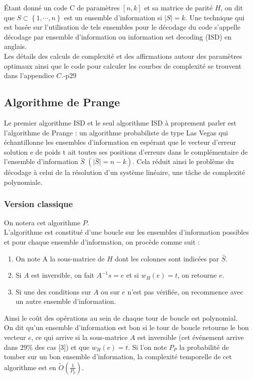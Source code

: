 \documentclass[12pt,openany]{report}
\begin{document}
Étant donné un code C de paramètres $\left[ n, k\right] $ et sa matrice de parité $\mathit{H}$, on dit
que $S \subset \left\lbrace 1,\cdots, n\right\rbrace $ est un ensemble d’information si $\mid S \mid = k$. Une technique qui
est basée sur l’utilisation de tels ensembles pour le décodage du code s’appelle décodage par ensemble d’information ou information set decoding (ISD) en anglais.\\
Les détails des calculs de complexité et des affirmations autour des paramètres optimaux ainsi que le code pour calculer les courbes de complexité se trouvent dans l’appendice $\mathit{C}$.\cite{Ghazal}-p29
\subsection{ Algorithme de Prange}

Le premier algorithme ISD et le seul algorithme ISD à proprement parler est l’algorithme de Prange : un algorithme probabiliste de type Las Vegas qui échantillonne les ensembles d’information en espérant que le vecteur d’erreur solution e de poids t ait toutes ses positions d’erreurs dans le complémentaire de l’ensemble d’information $\overset{-}{S} $ $(\mid \overset{-}{S} \mid = n-k)$. Cela réduit ainsi le problème du décodage à celui de la résolution d’un système linéaire, une tâche de complexité polynomiale.
\subsubsection{Version classique}
On notera cet algorithme $\mathit{P}$.\cite{Ghazal}\\
L’algorithme est constitué d’une boucle sur les ensembles d’information possibles et pour chaque ensemble d’information, on procède comme suit :
\begin{enumerate}
\item On note A la sous-matrice de $\mathit{H}$ dont les colonnes sont indicées par $\overset{-}{\mathit{S}}$.
\item Si $\mathit{A}$ est inversible, on fait $\mathit{A}^{-1}
s = e$ et si $w_{H}(e) = t$, on retourne $e$.
\item Si une des conditions sur $\mathit{A}$ ou sur $e$ n’est pas vérifiée, on recommence avec un autre ensemble d’information.

\end{enumerate}
Ainsi le coût des opérations au sein de chaque tour de boucle est polynomial.\\
On dit qu’un ensemble d’information est bon si le tour de boucle retourne le bon vecteur $e$, ce qui arrive si la sous-matrice $\mathit{A}$ est inversible (cet événement
arrive dans $ 29\% $ des cas [3]) et que $w_H(e) = t$. Si l’on note      $\mathit{P}_{P}$ la probabilité de tomber sur un bon ensemble d’information, la complexité temporelle de cet algorithme est en $\tilde{O}(\frac{1}{\mathit{P}_{p}})$.
\end{document}
